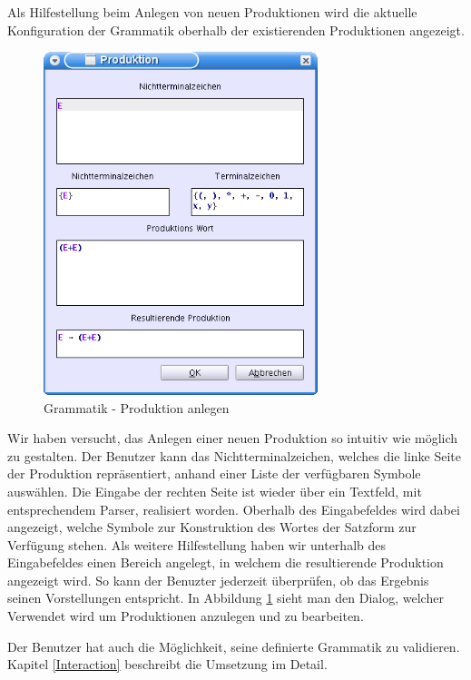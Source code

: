 Als Hilfestellung beim Anlegen von neuen Produktionen wird die aktuelle
Konfiguration der Grammatik oberhalb der existierenden Produktionen
angezeigt.\vspace{10pt}


\begin{figure}[h!]
\begin{center}
\includegraphics[width=8cm]{../images/production_dialog.png}
\caption{Grammatik - Produktion anlegen}
\label{FigureAddProduction}
\end{center}
\end{figure}
\vspace{10pt}

Wir haben versucht, das Anlegen einer neuen Produktion so intuitiv wie möglich
zu gestalten. Der Benutzer kann das Nichtterminalzeichen, welches die linke
Seite der Produktion repräsentiert, anhand einer Liste der
verfügbaren Symbole auswählen. Die Eingabe der rechten Seite ist
wieder über ein Textfeld, mit entsprechendem Parser, realisiert
worden. Oberhalb des Eingabefeldes wird dabei angezeigt, welche Symbole zur
Konstruktion des Wortes der Satzform zur Verfügung stehen. Als weitere
Hilfestellung haben wir unterhalb des Eingabefeldes einen Bereich angelegt,
in welchem die resultierende Produktion angezeigt wird. So kann der
Benuzter jederzeit überprüfen, ob das Ergebnis seinen
Vorstellungen entspricht. In Abbildung \ref{FigureAddProduction}
sieht man den Dialog, welcher Verwendet wird um Produktionen
anzulegen und zu bearbeiten.\vspace{10pt}

Der Benutzer hat auch die Möglichkeit, seine definierte Grammatik zu validieren.
Kapitel \ref{Interaction} beschreibt die Umsetzung im Detail.\vspace{10pt}


